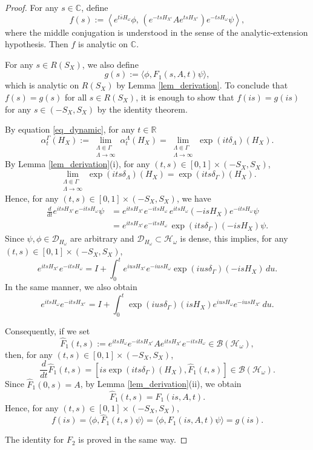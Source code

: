 \documentclass[11pt]{article}
\numberwithin{equation}{section}
\begin{document}
\begin{proof}
For any $s\in\mathbb{C}$, define
\[
f(s):=\left\langle e^{t\bar{s}H_\omega}\phi,\,
\left(e^{-tsH_{X^c}}Ae^{tsH_{X^c}}\right)
e^{-tsH_\omega}\psi\right\rangle,
\]
where the middle conjugation is understood in the sense of the analytic-extension hypothesis. Then $f$ is analytic on $\mathbb{C}$.

For any $s\in R(S_X)$, we also define
\[
g(s):=\langle\phi,F_1(s,A,t)\psi\rangle,
\]
which is analytic on $R(S_X)$ by Lemma \ref{lem_derivation}. To conclude that $f(s)=g(s)$ for all $s\in R(S_X)$, it is enough to show that $f(is)=g(is)$ for any $s\in(-S_X,S_X)$ by the identity theorem.

By equation \eqref{eq_dynamic}, for any $t\in\mathbb{R}$
\[
\alpha_t^\Gamma(H_X)
:=\lim_{\substack{\Lambda\Subset\Gamma\\ \Lambda\to\infty}} \alpha_t^\Lambda(H_X)
=\lim_{\substack{\Lambda\Subset\Gamma\\ \Lambda\to\infty}} \exp(it\delta_\Lambda)(H_X).
\]
By Lemma \ref{lem_derivation}(i), for any $(t,s)\in[0,1]\times(-S_X,S_X)$,
\[
\lim_{\substack{\Lambda\Subset\Gamma\\ \Lambda\to\infty}} \exp(its\delta_\Lambda)(H_X)
=\exp(its\delta_\Gamma)(H_X).
\]
Hence, for any $(t,s)\in[0,1]\times(-S_X,S_X)$, we have
\begin{align*}
\frac{d}{dt}e^{itsH_{X^c}} e^{-itsH_\omega}\psi
&=e^{itsH_{X^c}}e^{-itsH_\omega}\,
e^{itsH_\omega}(-isH_X)e^{-itsH_\omega}\psi\\
&=e^{itsH_{X^c}}e^{-itsH_\omega}\,
\exp(its\delta_\Gamma)(-isH_X)\psi.
\end{align*}
Since $\psi,\phi\in\mathcal{D}_{H_\omega}$ are arbitrary and $\mathcal{D}_{H_\omega} \subset\mathcal{H}_\omega$ is dense, this implies, for any $(t,s)\in[0,1]\times(-S_X,S_X)$,
\[
e^{itsH_{X^c}}e^{-itsH_\omega}
=I+\int_0^t e^{iusH_{X^c}}e^{-iusH_\omega} \exp(ius\delta_\Gamma)(-isH_X) \,du.
\]
In the same manner, we also obtain
\[
e^{itsH_\omega}e^{-itsH_{X^c}}
=I+\int_0^t \exp(ius\delta_\Gamma)(isH_X) e^{ius H_\omega}e^{-iusH_{X^c}}\,du.
\]

Consequently, if we set
\[
\hat{F}_1(t,s):=e^{itsH_\omega}e^{-itsH_{X^c}} A e^{itsH_{X^c}}e^{-itsH_\omega} \in\mathcal{B}(\mathcal{H}_\omega),
\]
then, for any $(t,s)\in[0,1]\times(-S_X,S_X)$,
\[
\frac{d}{dt} \hat{F}_1(t,s)
=[is\exp(its\delta_\Gamma)(H_X),\hat{F}_1(t,s)]
\in\mathcal{B}(\mathcal{H}_\omega).
\]
Since $\hat{F}_1(0,s)=A$, by Lemma \ref{lem_derivation}(ii), we obtain
\[
\hat{F}_1(t,s)=F_1(is,A,t).
\]
Hence, for any $(t,s)\in[0,1]\times(-S_X,S_X)$,
\[
f(is)=\langle\phi,\hat{F}_1(t,s)\psi\rangle=\langle\phi,F_1(is,A,t)\psi\rangle=g(is).
\]

The identity for $F_2$ is proved in the same way.
\end{proof}
\end{document}
